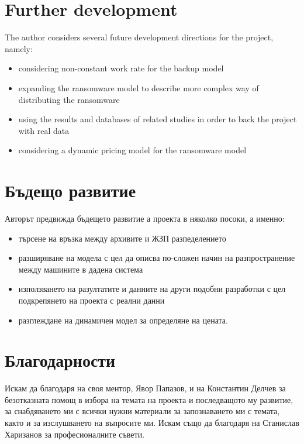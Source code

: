 \documentclass[11pt, a4paper]{article}
\theoremstyle{definition}
\begin{document}
\section{Further development}
The author considers several future development directions for the project, namely:
\begin{itemize}
	\item considering non-constant work rate for the backup model
	\item expanding the ransomware model to describe more complex way of distributing the ransomware
	\item using the results and databases of related studies in order to back the project with real data\cite{paquet2019ransomware}
	\item considering a dynamic pricing model for the ransomware model
\end{itemize}
\section{Бъдещо развитие}
	Авторът предвижда бъдещето развитие а проекта в няколко посоки, а именно:
	\begin{itemize}
		\item търсене на връзка между архивите и ЖЗП разпеделението
		\item разширяване на модела с цел да описва по-сложен начин на разпространение между машините в дадена система
		\item използването на разултатите и данните на други подобни разработки с цел подкрепянето на проекта с реални данни\cite{paquet2019ransomware}
		\item разглеждане на динамичен модел за определяне на цената.
	\end{itemize}
\section{Благодарности}
Искам да благодаря на своя ментор, Явор Папазов, и на Константин Делчев за безотказната помощ в избора на темата на проекта и последващото му развитие, за снабдяването ми с всички нужни материали за запознаването ми с темата, както и за изслушването на въпросите ми. Искам също да благодаря на Станислав Харизанов за професионалните съвети.
\nocite{*}


\end{document}
